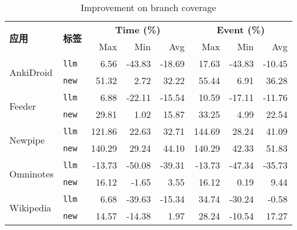 \documentclass{article}
\begin{document}
\begin{table}[ht]
\centering
\small
\begin{tabular}{llrrrrrr}
\toprule
\multirow{2}{*}{\textbf{应用}} & \multirow{2}{*}{\textbf{标签}} & \multicolumn{3}{c}{\textbf{Time (\%)}} & \multicolumn{3}{c}{\textbf{Event (\%)}} \\
\cmidrule(lr){3-5} \cmidrule(lr){6-8}
& & Max & Min & Avg & Max & Min & Avg \\
\midrule

\multirow{2}{*}{AnkiDroid} 
    & \texttt{llm}  & 6.56  & {-43.83} & {-18.69} & 17.63 & {-43.83} & {-10.45} \\
    & \texttt{new}  & {51.32} & {2.72}   & {32.22}  & {55.44} & {6.91}   & {36.28}  \\
\midrule

\multirow{2}{*}{Feeder} 
    & \texttt{llm}  & 6.88  & {-22.11} & {-15.54} & 10.59 & {-17.11} & {-11.76} \\
    & \texttt{new}  & {29.81} & {1.02}   & {15.87}  & {33.25} & {4.99}   & {22.54}  \\
\midrule

\multirow{2}{*}{Newpipe} 
    & \texttt{llm}  & {121.86} & {22.63}  & {32.71}  & 144.69 & 28.24  & 41.09  \\
    & \texttt{new}  & {140.29} & {29.24}  & {44.10}  & {140.29} & {42.33}  & {51.83}  \\
\midrule

\multirow{2}{*}{Omninotes} 
    & \texttt{llm}         & -13.73 & {-50.08} & {-39.31} & -13.73 & {-47.34} & {-35.73} \\
    & \texttt{new}         & {16.12}  & {-1.65}  & {3.55}   & {16.12}  & {0.19}   & {9.44}   \\
\midrule

\multirow{2}{*}{Wikipedia} 
    & \texttt{llm}         & 6.68   & {-39.63} & {-15.34} & {34.74}  & -30.24 & -0.58  \\
    & \texttt{new}         & {14.57}  & {-14.38} & {1.97}   & 28.24  & {-10.54} & {17.27}  \\
\bottomrule
\end{tabular}
\caption{Improvement on branch coverage}
\label{tab:branch-coverage-improvement}
\end{table}
\end{document}
